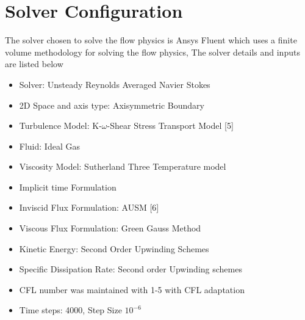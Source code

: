 \section{Solver Configuration} 
\label{sec:Solver}

The solver chosen to solve the flow physics is Ansys Fluent which uses a finite volume methodology for solving the flow physics, The solver details and inputs are listed below
\begin{itemize}
  \item Solver: Unsteady Reynolds Averaged Navier Stokes

  \item 2D Space and axis type: Axisymmetric Boundary
  \item Turbulence Model: K-\(\omega\)-Shear Stress Transport Model [5]
  \item Fluid: Ideal Gas
  \item Viscosity Model: Sutherland Three Temperature model
     \item Implicit time Formulation
  \item Inviscid Flux Formulation: AUSM [6]
  \item Viscous Flux Formulation: Green Gauss Method
  \item Kinetic Energy: Second Order Upwinding Schemes
  \item Specific Dissipation Rate: Second order Upwinding schemes
  \item CFL number was maintained with 1-5 with CFL adaptation
  \item Time steps: 4000, Step Size \(10^{-6}\)
\end{itemize}
